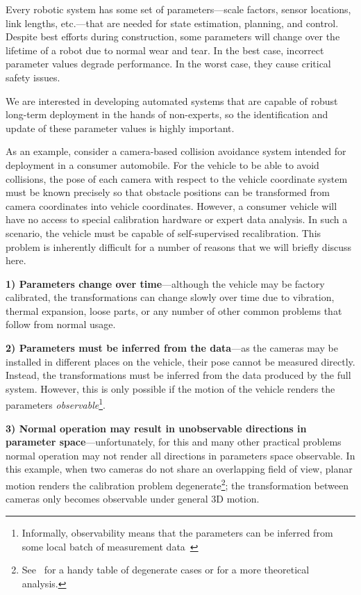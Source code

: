 Every robotic system has some set of parameters---scale factors, sensor
locations, link lengths, etc.---that are needed for state estimation, planning,
and control. Despite best efforts during construction, some parameters will
change over the lifetime of a robot due to normal wear and tear. In the best
case, incorrect parameter values degrade performance. In the worst case, they
cause critical safety issues.

We are interested in developing automated systems that are capable of robust
long-term deployment in the hands of non-experts, so the identification and
update of these parameter values is highly important.

As an example, consider a camera-based collision avoidance system intended for
deployment in a consumer automobile. For the vehicle to be able to avoid
collisions, the pose of each camera with respect to the vehicle coordinate
system must be known precisely so that obstacle positions can be transformed
from camera coordinates into vehicle coordinates. However, a consumer vehicle
will have no access to special calibration hardware or expert data analysis.
In such a scenario, the vehicle must be capable of self-supervised
recalibration. This problem is inherently difficult for a number of reasons that
we will briefly discuss here.

{\bf 1) Parameters change over time}---although the vehicle may be factory
calibrated, the transformations can change slowly over time due to vibration,
thermal expansion, loose parts, or any number of other common problems that
follow from normal usage.

{\bf 2) Parameters must be inferred from the data}---as the cameras may be
installed in different places on the vehicle, their pose cannot be measured
directly. Instead, the transformations must be inferred from the data produced
by the full system. However, this is only possible if the motion of the vehicle
renders the parameters {\em observable}\footnote{Informally, observability
means that the parameters can be inferred from some local batch of measurement
data~\cite{jazwinski70stochastic}}.

{\bf 3) Normal operation may result in unobservable directions in parameter
space}---unfortunately, for this and many other practical problems normal
operation may not render all directions in parameters space observable. In this
example, when two cameras do not share an overlapping field of view, planar
motion renders the calibration problem
degenerate\footnote{See~\cite{lebraly10calibration} for a handy table of
degenerate cases or \cite{kim06absolute} for a more theoretical analysis.}; the
transformation between cameras only becomes observable under general 3D motion.

